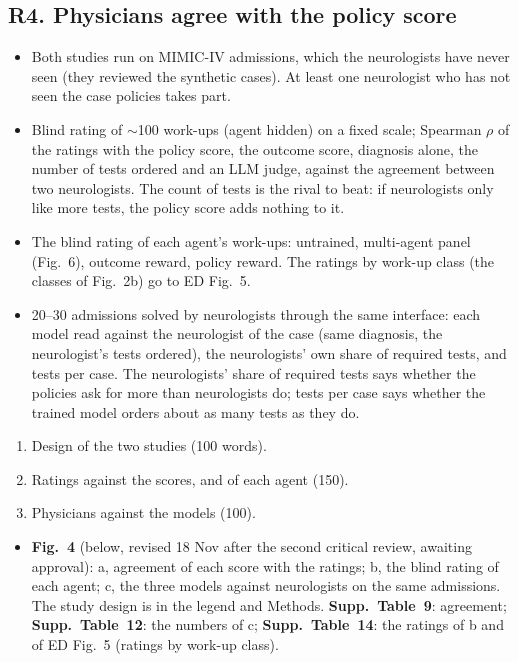 \subsection{R4. Physicians agree with the policy score}\label{sec:validity}


\content
\begin{itemize}
\item Both studies run on MIMIC-IV admissions, which the neurologists have never seen (they reviewed
the synthetic cases). At least one neurologist who has not seen the case policies takes part.
\item Blind rating of $\sim$100 work-ups (agent hidden) on a fixed scale; Spearman $\rho$ of the
ratings with the policy score, the outcome score, diagnosis alone, the number of tests ordered and an
LLM judge, against the agreement between two neurologists. The count of tests is the rival to beat:
if neurologists only like more tests, the policy score adds nothing to it.
\item The blind rating of each agent's work-ups: untrained, multi-agent panel (Fig.~6), outcome reward,
policy reward. The ratings by work-up class (the classes of Fig.~2b) go to ED Fig.~5.
\item 20--30 admissions solved by neurologists through the same interface: each model read against
the neurologist of the case (same diagnosis, the neurologist's tests ordered), the neurologists' own
share of required tests, and tests per case. The neurologists' share of required tests says whether
the policies ask for more than neurologists do; tests per case says whether the trained model orders
about as many tests as they do.
\end{itemize}

\structure
\begin{enumerate}
\item Design of the two studies (100 words).
\item Ratings against the scores, and of each agent (150).
\item Physicians against the models (100).
\end{enumerate}

\artefacts
\begin{itemize}
\item \textbf{Fig.~4} (below, revised 18 Nov after the second critical review, awaiting approval): a,
agreement of each score with the ratings; b, the blind rating of each agent; c, the three models
against neurologists on the same admissions. The study design is in the legend and Methods.
\textbf{Supp.\ Table~9}: agreement; \textbf{Supp.\ Table~12}: the numbers of c; \textbf{Supp.\
Table~14}: the ratings of b and of ED Fig.~5 (ratings by work-up class).
\end{itemize}

